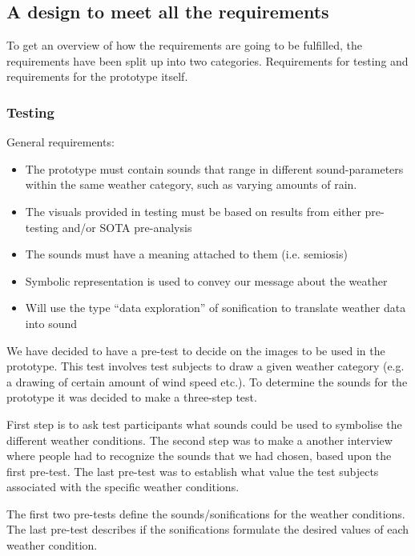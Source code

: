\subsection{A design to meet all the requirements} %
\label{sub:a_design_to_meet_all_the_requirements}

To get an overview of how the requirements are going to be fulfilled, the requirements have been split up into two categories. Requirements for testing and requirements for the prototype itself.

\subsubsection{Testing} %
\label{ssub:testing}

General requirements:

\begin{itemize}
    \item The prototype must contain sounds that range in different sound-parameters within the same weather category, such as varying amounts of rain.
    \item The visuals provided in testing must be based on results from either pre-testing and/or SOTA pre-analysis
    \item The sounds must have a meaning attached to them (i.e. semiosis)
    \item Symbolic representation is used to convey our message about the weather
    \item Will use the type “data exploration” of sonification to translate weather data into sound
\end{itemize}

We have decided to have a pre-test to decide on the images to be used in the prototype. 
This test involves test subjects to draw a given weather category (e.g. a drawing of certain amount of wind speed etc.). 
To determine the sounds for the prototype it was decided to make a three-step test. 

First step is to ask test participants what sounds could be used to symbolise the different weather conditions.
The second step was to make a another interview where people had to recognize the sounds that we had chosen, based upon the first pre-test. 
The last pre-test was to establish what value the test subjects associated with the specific weather conditions.

The first two pre-tests define the sounds/sonifications for the weather conditions. 
The last pre-test describes if the sonifications formulate the desired values of each weather condition.

